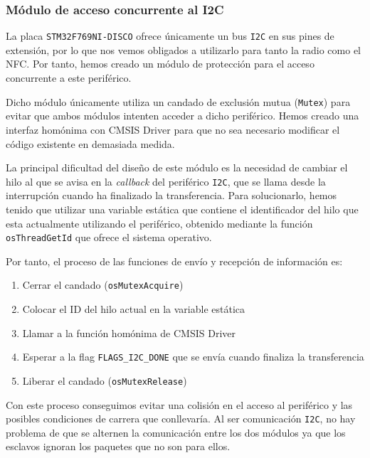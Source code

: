 \subsubsection{Módulo de acceso concurrente al I2C}

La placa \texttt{STM32F769NI-DISCO} ofrece únicamente un bus \texttt{I2C} en sus pines de extensión, por lo que nos vemos obligados a utilizarlo para tanto la radio como el NFC. Por tanto, hemos creado un módulo de protección para el acceso concurrente a este periférico. 

Dicho módulo únicamente utiliza un candado de exclusión mutua (\texttt{Mutex}) para evitar que ambos módulos intenten acceder a dicho periférico. Hemos creado una interfaz homónima con CMSIS Driver para que no sea necesario modificar el código existente en demasiada medida.

La principal dificultad del diseño de este módulo es la necesidad de cambiar el hilo al que se avisa en la \textit{callback} del periférico \texttt{I2C}, que se llama desde la interrupción cuando ha finalizado la transferencia. Para solucionarlo, hemos tenido que utilizar una variable estática que contiene el identificador del hilo que esta actualmente utilizando el periférico, obtenido mediante la función \texttt{osThreadGetId} que ofrece el sistema operativo.

Por tanto, el proceso de las funciones de envío y recepción de información es:
\begin{enumerate}
    \item Cerrar el candado (\texttt{osMutexAcquire})
    \item Colocar el ID del hilo actual en la variable estática
    \item Llamar a la función homónima de CMSIS Driver
    \item Esperar a la flag \texttt{FLAGS\_I2C\_DONE} que se envía cuando finaliza la transferencia
    \item Liberar el candado (\texttt{osMutexRelease})
\end{enumerate}

Con este proceso conseguimos evitar una colisión en el acceso al periférico y las posibles condiciones de carrera que conllevaría. Al ser comunicación \texttt{I2C}, no hay problema de que se alternen la comunicación entre los dos módulos ya que los esclavos ignoran los paquetes que no son para ellos.
